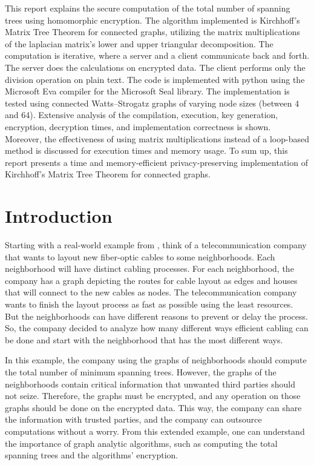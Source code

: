 \documentclass{winslabreport}
\begin{document}
\restoregeometry
\maketitle

\summary
This report explains the secure computation of the total number of spanning trees using homomorphic encryption. The algorithm implemented is Kirchhoff's Matrix Tree Theorem for connected graphs, utilizing the matrix multiplications of the laplacian matrix's lower and upper triangular decomposition. The computation is iterative, where a server and a client communicate back and forth. The server does the calculations on encrypted data. The client performs only the division operation on plain text. The code is implemented with python using the Microsoft Eva compiler for the Microsoft Seal library. The implementation is tested using connected Watts–Strogatz graphs of varying node sizes (between 4 and 64). Extensive analysis of the compilation, execution, key generation, encryption, decryption times, and implementation correctness is shown. Moreover, the effectiveness of using matrix multiplications instead of a loop-based method is discussed for execution times and memory usage. To sum up, this report presents a time and memory-efficient privacy-preserving implementation of Kirchhoff's Matrix Tree Theorem for connected graphs.

\tableofcontents
\listoffigures
\body

\section{Introduction}
Starting with a real-world example from \cite{MSTExamp}, think of a telecommunication company that wants to layout new fiber-optic cables to some neighborhoods. Each neighborhood will have distinct cabling processes. For each neighborhood, the company has a graph depicting the routes for cable layout as edges and houses that will connect to the new cables as nodes. The telecommunication company wants to finish the layout process as fast as possible using the least resources. But the neighborhoods can have different reasons to prevent or delay the process. So, the company decided to analyze how many different ways efficient cabling can be done and start with the neighborhood that has the most different ways. 

In this example, the company using the graphs of neighborhoods should compute the total number of minimum spanning trees. However, the graphs of the neighborhoods contain critical information that unwanted third parties should not seize. Therefore, the graphs must be encrypted, and any operation on those graphs should be done on the encrypted data. This way, the company can share the information with trusted parties, and the company can outsource computations without a worry. From this extended example, one can understand the importance of graph analytic algorithms, such as computing the total spanning trees and the algorithms' encryption.
\end{document}
